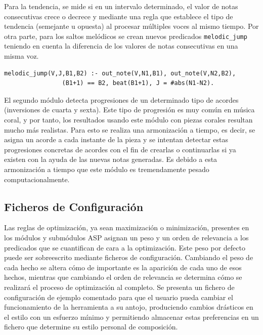 Para la tendencia, se mide si en un intervalo determinado, el valor de notas consecutivas crece o decrece y mediante una regla que establece el tipo de tendencia (semejante u opuesta) al procesar múltiples voces al mismo tiempo. Por otra parte, para los saltos melódicos se crean nuevos predicados \texttt{melodic\_jump} teniendo en cuenta la diferencia de los valores de notas consecutivas en una misma voz.

\begin{Verbatim}[frame=single]
melodic_jump(V,J,B1,B2) :- out_note(V,N1,B1), out_note(V,N2,B2),
             	(B1+1) == B2, beat(B1+1), J = #abs(N1-N2). 
\end{Verbatim}

El segundo módulo detecta progresiones de un determinado tipo de acordes (inversiones de cuarta y sexta). Este tipo de progresión es muy común en música coral, y por tanto, los resultados usando este módulo con piezas corales resultan mucho más realistas. Para esto se realiza una armonización a tiempo, es decir, se asigna un acorde a cada instante de la pieza y se intentan detectar estas progresiones concretas de acordes con el fin de crearlas o continuarlas si ya existen con la ayuda de las nuevas notas generadas. Es debido a esta armonización a tiempo que este módulo es tremendamente pesado computacionalmente.

\subsection{Ficheros de Configuración}
Las reglas de optimización, ya sean maximización o minimización, presentes en los módulos y submódulos ASP asignan un peso y un orden de relevancia a los predicados que se cuantifican de cara a la optimización. Este peso por defecto puede ser sobreescrito mediante ficheros de configuración. Cambiando el peso de cada hecho se altera cómo de importante es la aparición de cada uno de esos hechos, mientras que cambiando el orden de relevancia se determina cómo se realizará el proceso de optimización al completo.
Se presenta un fichero de configuración de ejemplo comentado para que el usuario pueda cambiar el funcionamiento de la herramienta a su antojo, produciendo cambios drásticos en el estilo con un esfuerzo mínimo y permitiendo almacenar estas preferencias en un fichero que determine su estilo personal de composición.


